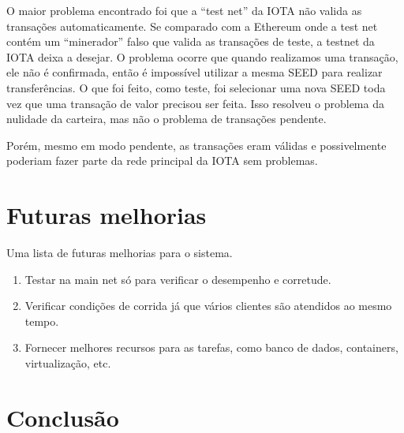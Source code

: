 \documentclass[a4paper]{article}
\begin{document}
O maior problema encontrado foi que a ``test net'' da IOTA não valida as transações automaticamente. Se comparado com a Ethereum onde a test net
contém um ``minerador'' falso que valida as transações de teste, a testnet da IOTA deixa a desejar. O problema ocorre que quando
realizamos uma transação, ele não é confirmada, então é impossível utilizar a mesma SEED para realizar transferências. O que foi feito,
como teste, foi selecionar uma nova SEED toda vez que uma transação de valor precisou ser feita. Isso resolveu o problema da nulidade
da carteira, mas não o problema de transações pendente.

Porém, mesmo em modo pendente, as transações eram válidas e possivelmente poderiam fazer parte da rede principal da IOTA
sem problemas.

\section{Futuras melhorias}\label{sec:Future}

Uma lista de futuras melhorias para o sistema.

\begin{enumerate}
\item Testar na main net só para verificar o desempenho e corretude.
\item Verificar condições de corrida já que vários clientes são atendidos ao mesmo tempo.
\item Fornecer melhores recursos para as tarefas, como banco de dados, containers, virtualização, etc.
\end{enumerate}

\section{Conclusão}


%
%
\end{document}

